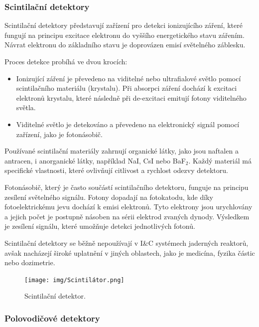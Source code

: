 \subsubsection{Scintilační detektory}

Scintilační detektory představují zařízení pro detekci ionizujícího záření, které fungují na principu excitace elektronu do vyššího energetického stavu zářením. Návrat elektronu do základního stavu je doprovázen emisí světelného záblesku.

Proces detekce probíhá ve dvou krocích:

\begin{itemize}
    \item Ionizující záření je převedeno na viditelné nebo ultrafialové světlo pomocí scintilačního materiálu (krystalu). Při absorpci záření dochází k excitaci elektronů krystalu, které následně při de-excitaci emitují fotony viditelného světla.
    \item  Viditelné světlo je detekováno a převedeno na elektronický signál pomocí zařízení, jako je fotonásobič.
\end{itemize}

Používané scintilační materiály zahrnují organické látky, jako jsou naftalen a antracen, i anorganické látky, například NaI, CsI nebo BaF$_2$. Každý materiál má specifické vlastnosti, které ovlivňují citlivost a rychlost odezvy detektoru.

Fotonásobič, který je často součástí scintilačního detektoru, funguje na principu zesílení světelného signálu. Fotony dopadají na fotokatodu, kde díky fotoelektrickému jevu dochází k emisi elektronů. Tyto elektrony jsou urychlovány a jejich počet je postupně násoben na sérii elektrod zvaných dynody. Výsledkem je zesílení signálu, které umožňuje detekci jednotlivých fotonů.

Scintilační detektory se běžně nepoužívají v I\&C systémech jaderných reaktorů, avšak nacházejí široké uplatnění v jiných oblastech, jako je medicína, fyzika částic nebo dozimetrie.

\begin{figure}[H] 
    \centering
    \texttt{[image: img/Scintilátor.png]}
    \caption{Scintilační detektor.}
    \label{fig:Scintilační detektor}
\end{figure}

\subsubsection{Polovodičové detektory}

